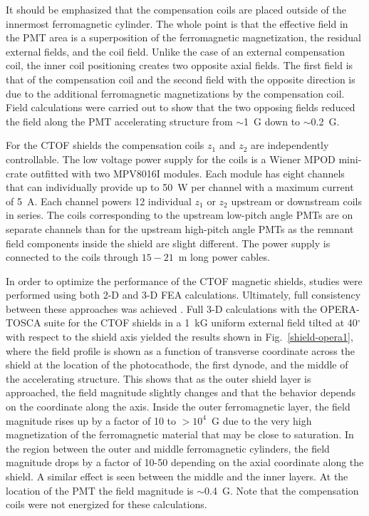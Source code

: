\documentclass[3p,times,twocolumn]{elsarticle}
\begin{document}
It should be emphasized that the compensation coils are placed outside of the innermost ferromagnetic
cylinder. The whole point is that the effective field in the PMT area is a superposition of the ferromagnetic
magnetization, the residual external fields, and the coil field. Unlike the case of an external compensation
coil, the inner coil positioning creates two opposite axial fields. The first field is that of the compensation
coil and the second field with the opposite direction is due to the additional ferromagnetic magnetizations
by the compensation coil. Field calculations were carried out to show that the two opposing fields reduced
the field along the PMT accelerating structure from $\sim$1~G down to $\sim$0.2~G.

For the CTOF shields the compensation coils $z_1$ and $z_2$ are independently controllable. The low
voltage power supply for the coils is a Wiener MPOD mini-crate outfitted with two MPV8016I modules. Each
module has eight channels that can individually provide up to 50~W per channel with a maximum current of
5~A. Each channel powers 12 individual $z_1$ or $z_2$ upstream or downstream coils in series. The coils
corresponding to the upstream low-pitch angle PMTs are on separate channels than for the upstream
high-pitch angle PMTs as the remnant field components inside the shield are slight different. The power
supply is connected to the coils through $15 - 21$~m long power cables. 

In order to optimize the performance of the CTOF magnetic shields, studies were performed using both
2-D and 3-D FEA calculations. Ultimately, full consistency between these approaches was achieved
\cite{cn2015-003}. Full 3-D calculations with the OPERA-TOSCA suite for the CTOF shields in a 1~kG
uniform external field tilted at 40$^\circ$ with respect to the shield axis yielded the results shown in
Fig.~\ref{shield-opera1}, where the field profile is shown as a function of transverse coordinate across the
shield at the location of the photocathode, the first dynode, and the middle of the accelerating structure.
This shows that as the outer shield layer is approached, the field magnitude slightly changes and that the
behavior depends on the coordinate along the axis. Inside the outer ferromagnetic layer, the field magnitude
rises up by a factor of 10 to $>10^4$~G due to the very high magnetization of the ferromagnetic material
that may be close to saturation. In the region between the outer and middle ferromagnetic cylinders, the
field magnitude drops by a factor of 10-50 depending on the axial coordinate along the shield. A similar effect
is seen between the middle and the inner layers. At the location of the PMT the field magnitude is
$\sim$0.4~G. Note that the compensation coils were not energized for these calculations. 
\end{document}
